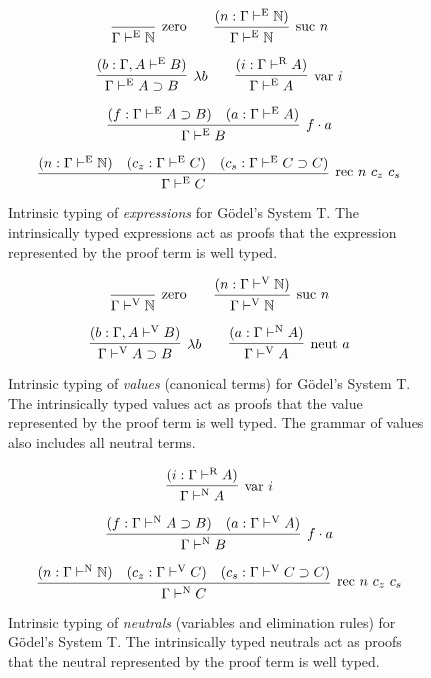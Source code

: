 \documentclass{llncs}
\def\arr{\supset}
\def\app{\cdot}
\def\lam{\lambda}
\def\nat{\mathbb{N}}
\newcommand{\turn}[1]{\vdash^\con{#1}}
\newcommand{\con}[1]{\textmd{#1}}
\newcommand{\fun}[1]{\textmd{#1}}
\newcommand{\type}[1]{\Gamma \turn{E} #1}
\newcommand{\ctype}[2]{\Gamma , #1 \turn{E} #2}
\newcommand{\typv}[1]{\Gamma \turn{V} #1}
\newcommand{\ctypv}[2]{\Gamma , #1 \turn{V} #2}
\newcommand{\typn}[1]{\Gamma \turn{N} #1}
\newcommand{\typr}[1]{\Gamma \turn{R} #1}
\begin{document}
\begin{figure}
\caption{
Intrinsic typing of \textit{expressions} for G{\"o}del's System T. The
intrinsically typed expressions act as proofs that the expression
represented by the proof term is well typed.
}
$$
\infer
  [\con{zero}]
  {\type{\nat}}
{}
\qquad
\infer
  [\con{suc} ~ n]
  {\type{\nat}}
{
  (n : \type{\nat})
}
$$

$$
\infer
  [\lam b]
  {\type{A \arr B}}
{
  (b : \ctype{A}{B})
}
\qquad
\infer
  [\fun{var} ~ i]
  {\type{A}}
{
  (i : \typr{A})
}
$$

$$
\infer
  [f \app a]
  {\type{B}}
{
  (f : \type{A \arr B})
  &
  (a : \type{A})
}
$$

$$
\infer
  [\fun{rec} ~ n ~ c_z ~ c_s]
  {\type{C}}
{
  (n : \type{\nat})
  &
  (c_z : \type{C})
  &
  (c_s : \type{C \arr C})
}
$$
\label{fig:type}
\end{figure}

\begin{figure}
\caption{
Intrinsic typing of \textit{values} (canonical terms) for G{\"o}del's System T.
The intrinsically typed values act as proofs that the value
represented by the proof term is well typed. The grammar of values
also includes all neutral terms.
}
$$
\infer
  [\con{zero}]
  {\typv{\nat}}
{}
\qquad
\infer
  [\con{suc} ~ n]
  {\typv{\nat}}
{
  (n : \typv{\nat})
}
$$

$$
\infer
  [\lam b]
  {\typv{A \arr B}}
{
  (b : \ctypv{A}{B})
}
\qquad
\infer
  [\fun{neut} ~ a]
  {\typv{A}}
{
  (a : \typn{A})
}
$$
\label{fig:typv}
\end{figure}

\begin{figure}
\caption{
Intrinsic typing of \textit{neutrals} (variables and elimination rules) 
for G{\"o}del's System T.
The intrinsically typed neutrals act as proofs that the neutral
represented by the proof term is well typed.
}

$$
\infer
  [\fun{var} ~ i]
  {\typn{A}}
{
  (i : \typr{A})
}
$$

$$
\infer
  [f \app a]
  {\typn{B}}
{
  (f : \typn{A \arr B})
  &
  (a : \typv{A})
}
$$

$$
\infer
  [\fun{rec} ~ n ~ c_z ~ c_s]
  {\typn{C}}
{
  (n : \typn{\nat})
  &
  (c_z : \typv{C})
  &
  (c_s : \typv{C \arr C})
}
$$
\label{fig:typn}
\end{figure}
\end{document}

